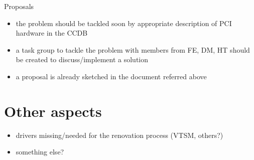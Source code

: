 \documentclass[compress,red]{beamer}
\begin{document}
\begin{frame}{Proposals}
\begin{itemize}
\item the problem should be tackled soon by appropriate description
	of PCI hardware in the CCDB
\item a task group to tackle the problem with members from
	FE, DM, HT should be created to discuss/implement a solution
\item a proposal is already sketched in the document referred above
\end{itemize}
\end{frame}

\section{Other aspects}

\begin{itemize}
\item drivers missing/needed for the renovation process (VTSM, others?)
\item something else?
\end{itemize}
\end{document}
